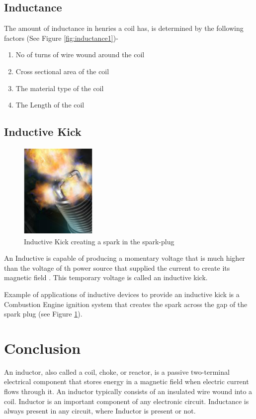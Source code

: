 		\subsection{Inductance}
			The amount of inductance in henries a coil has, is determined by the following factors (See Figure \ref{fig:inductance1})-
			\begin{enumerate}
				\tightlist
				\item No of turns of wire wound around the coil
				\item Cross sectional area of the coil
				\item The material type of the coil
				\item The Length of the coil
			\end{enumerate}
		\subsection{Inductive Kick}
			\begin{figure}[h]
				\centering
				\includegraphics[width=0.5\linewidth]{img/exp3/6}
				\caption{Inductive Kick creating a spark in the spark-plug}
				\label{fig:inductiveKick}
			\end{figure}			
			An Inductive is capable of producing a momentary voltage that is much higher than the voltage of th power source that supplied the current to create its magnetic field . This temporary voltage is called an inductive kick.
			
			Example of applications of inductive devices to provide an inductive kick is a Combustion Engine ignition system that creates the spark across the gap of the spark plug (see Figure \ref{fig:inductiveKick}).

	\section{Conclusion}
		An inductor, also called a coil, choke, or reactor, is a passive two-terminal electrical component that stores energy in a magnetic field when electric current flows through it. An inductor typically consists of an insulated wire wound into a coil. Inductor is an important component of any electronic circuit. Inductance is always present in any circuit, where Inductor is present or not.